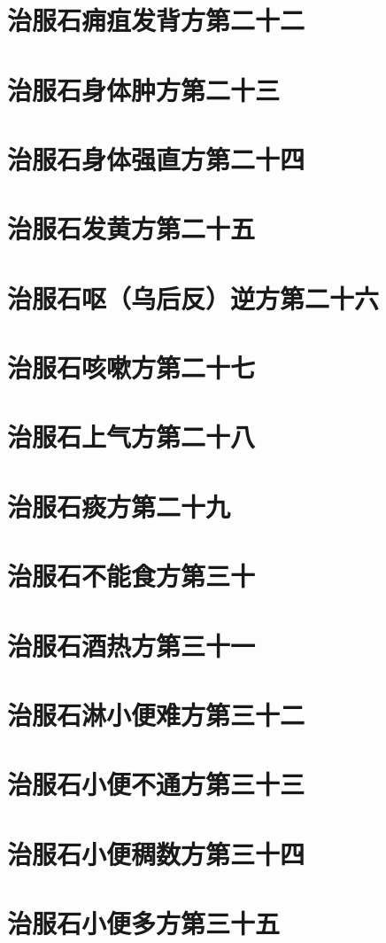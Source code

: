 \documentclass[a4paper,12pt,UTF8,twoside]{ctexbook}
\begin{document}
\chapter{治服石痈疽发背方第二十二}
\chapter{治服石身体肿方第二十三}
\chapter{治服石身体强直方第二十四}
\chapter{治服石发黄方第二十五}
\chapter{治服石呕（乌后反）逆方第二十六}
\chapter{治服石咳嗽方第二十七}
\chapter{治服石上气方第二十八}
\chapter{治服石痰方第二十九}
\chapter{治服石不能食方第三十}
\chapter{治服石酒热方第三十一}
\chapter{治服石淋小便难方第三十二}
\chapter{治服石小便不通方第三十三}
\chapter{治服石小便稠数方第三十四}
\chapter{治服石小便多方第三十五}
\end{document}
